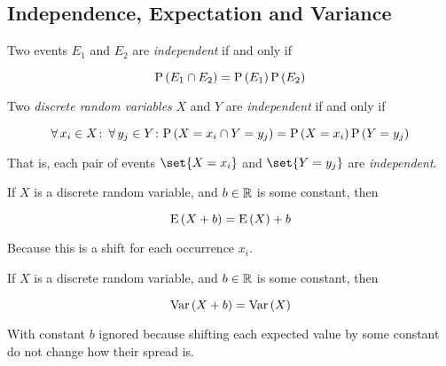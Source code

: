 \subsection{Independence, Expectation and Variance}

\begin{remark}
    Two events $E_1$ and $E_2$ are \textit{independent} if and only if
    
    \begin{equation*}
        \mathrm{P} \left( E_1 \cap E_2 \right) = \mathrm{P} \left( E_1 \right) \mathrm{P} \left( E_2 \right)
    \end{equation*}
\end{remark}

\begin{definition}
    Two \textit{discrete random variables} $X$ and $Y$ are \textit{independent} if and only if
    
    \begin{equation}
        \operatorname{\forall} x_i \in X \colon \operatorname{\forall} y_j \in Y \colon \mathrm{P} \left( X = x_i \cap Y = y_j \right) = \mathrm{P} \left( X = x_i \right) \mathrm{P} \left( Y = y_j \right)
    \end{equation}
    
    That is, each pair of events $\set{ X = x_i }$ and $\set{ Y = y_j }$ are \textit{independent}.
\end{definition}

\begin{definition}
    If $X$ is a discrete random variable, and $b \in \mathbb{R}$ is some constant, then
    
    \begin{equation}
        \mathrm{E} \left( X + b \right) = \mathrm{E} \left( X \right) + b
    \end{equation}
    
    Because this is a shift for each occurrence $x_i$.
\end{definition}

\begin{definition}
    If $X$ is a discrete random variable, and $b \in \mathbb{R}$ is some constant, then
    
    \begin{equation}
        \mathrm{Var} \left( X + b \right) = \mathrm{Var} \left( X \right)
    \end{equation}
    
    With constant $b$ ignored because shifting each expected value by some constant do not change how their spread is.
\end{definition}

